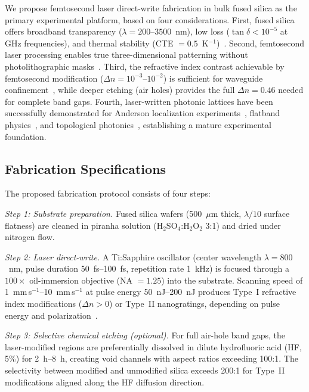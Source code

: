 \documentclass[10pt,letterpaper]{article}
\begin{document}
We propose femtosecond laser direct-write fabrication in bulk fused silica as the primary experimental platform, based on four considerations. First, fused silica offers broadband transparency ($\lambda = 200$--$3500$~nm), low loss ($\tan\delta < 10^{-5}$ at GHz frequencies), and thermal stability (CTE $= 0.5$~K$^{-1}$)~\cite{Johnson2000}. Second, femtosecond laser processing enables true three-dimensional patterning without photolithographic masks~\cite{Davis1996,SzameitNolte2010}. Third, the refractive index contrast achievable by femtosecond modification ($\Delta n = 10^{-3}$--$10^{-2}$) is sufficient for waveguide confinement~\cite{SzameitNolte2010}, while deeper etching (air holes) provides the full $\Delta n = 0.46$ needed for complete band gaps. Fourth, laser-written photonic lattices have been successfully demonstrated for Anderson localization experiments~\cite{Pertsch2002,Wiersma1997}, flatband physics~\cite{Lustig2019}, and topological photonics~\cite{Rechtsman2013}, establishing a mature experimental foundation.

\subsection{Fabrication Specifications}

The proposed fabrication protocol consists of four steps:

\textit{Step 1: Substrate preparation.} Fused silica wafers (500~$\mu$m thick, $\lambda/10$ surface flatness) are cleaned in piranha solution (H$_2$SO$_4$:H$_2$O$_2$ 3:1) and dried under nitrogen flow.

\textit{Step 2: Laser direct-write.} A Ti:Sapphire oscillator (center wavelength $\lambda = 800$~nm, pulse duration 50~fs--100~fs, repetition rate 1~kHz) is focused through a $100\times$ oil-immersion objective (NA $= 1.25$) into the substrate. Scanning speed of 1~mm\,s$^{-1}$--10~mm\,s$^{-1}$ at pulse energy 50~nJ--200~nJ produces Type~I refractive index modifications ($\Delta n > 0$) or Type~II nanogratings, depending on pulse energy and polarization~\cite{Davis1996}.

\textit{Step 3: Selective chemical etching (optional).} For full air-hole band gaps, the laser-modified regions are preferentially dissolved in dilute hydrofluoric acid (HF, 5\%) for 2~h--8~h, creating void channels with aspect ratios exceeding 100:1. The selectivity between modified and unmodified silica exceeds 200:1 for Type~II modifications aligned along the HF diffusion direction.
\end{document}

